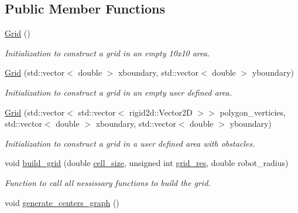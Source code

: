 \subsection*{Public Member Functions}
\begin{DoxyCompactItemize}
\item 
\mbox{\label{classgrid_1_1Grid_afcee115a9437842956e1efe9e202c302}} 
\hyperlink{classgrid_1_1Grid_afcee115a9437842956e1efe9e202c302}{Grid} ()
\begin{DoxyCompactList}\small\item\em Initialization to construct a grid in an empty 10x10 area. \end{DoxyCompactList}\item 
\hyperlink{classgrid_1_1Grid_a39cd30c1ee231fde7f5a3f228a326ac1}{Grid} (std\+::vector$<$ double $>$ xboundary, std\+::vector$<$ double $>$ yboundary)
\begin{DoxyCompactList}\small\item\em Initialization to construct a grid in an empty user defined area. \end{DoxyCompactList}\item 
\hyperlink{classgrid_1_1Grid_a3fd6c9bb56bc7ae63d6126312e001f23}{Grid} (std\+::vector$<$ std\+::vector$<$ rigid2d\+::\+Vector2D $>$$>$ polygon\+\_\+verticies, std\+::vector$<$ double $>$ xboundary, std\+::vector$<$ double $>$ yboundary)
\begin{DoxyCompactList}\small\item\em Initialization to construct a grid in a user defined area with obstacles. \end{DoxyCompactList}\item 
void \hyperlink{classgrid_1_1Grid_adcba03289a5d2de6e209b2a3ded5d5ac}{build\+\_\+grid} (double \hyperlink{classgrid_1_1Grid_acb1ca003a2aeafe6b554d9ac27b29109}{cell\+\_\+size}, unsigned int \hyperlink{classgrid_1_1Grid_a574ec32cb3346c1be8de79ccc38cd47b}{grid\+\_\+res}, double robot\+\_\+radius)
\begin{DoxyCompactList}\small\item\em Function to call all nessissary functions to build the grid. \end{DoxyCompactList}\item 
\mbox{\label{classgrid_1_1Grid_a6620e51207bbd6ca60f868b120cb7e04}} 
void \hyperlink{classgrid_1_1Grid_a6620e51207bbd6ca60f868b120cb7e04}{generate\+\_\+centers\+\_\+graph} ()
$$
\end{DoxyCompactItemize}
